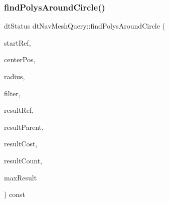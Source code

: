 \subsubsection{\texorpdfstring{find\+Polys\+Around\+Circle()}{findPolysAroundCircle()}\hspace{0.1cm}{\footnotesize\ttfamily [1/2]}}
{\footnotesize\ttfamily dt\+Status dt\+Nav\+Mesh\+Query\+::find\+Polys\+Around\+Circle (\begin{DoxyParamCaption}\item[{\hyperlink{group__detour_gab4e0b2257a670c1a800057999612b466}{dt\+Poly\+Ref}}]{start\+Ref,  }\item[{const float $\ast$}]{center\+Pos,  }\item[{const float}]{radius,  }\item[{const \hyperlink{classdtQueryFilter}{dt\+Query\+Filter} $\ast$}]{filter,  }\item[{\hyperlink{group__detour_gab4e0b2257a670c1a800057999612b466}{dt\+Poly\+Ref} $\ast$}]{result\+Ref,  }\item[{\hyperlink{group__detour_gab4e0b2257a670c1a800057999612b466}{dt\+Poly\+Ref} $\ast$}]{result\+Parent,  }\item[{float $\ast$}]{result\+Cost,  }\item[{int $\ast$}]{result\+Count,  }\item[{const int}]{max\+Result }\end{DoxyParamCaption}) const}

